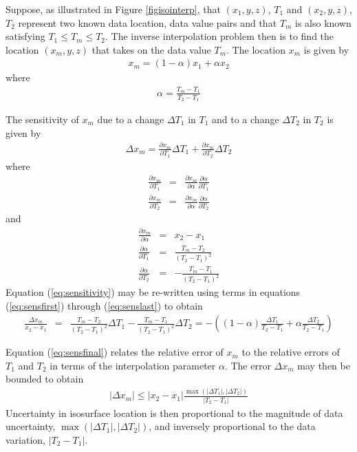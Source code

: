 \documentclass[11pt,twoside]{book}
\newcommand{\pxtone}{ \frac{\partial x_m}{\partial T_1} }
\newcommand{\pxttwo}{ \frac{\partial x_m}{\partial T_2} }
\newcommand{\pxalpha}{ \frac{\partial x_m}{\partial \alpha} }
\newcommand{\palphatone}{ \frac{\partial \alpha}{\partial T_1} }
\newcommand{\palphattwo}{ \frac{\partial \alpha}{\partial T_2} }
\begin{document}
Suppose, as illustrated in Figure \ref{figisointerp}, that $(x_1,y,z)$, $T_1$ and $(x_2,y,z)$, $T_2$ represent two known data location, data value pairs and that $T_m$ is also known satisfying $T_1\le T_m \le T_2$.  The inverse interpolation problem then is to find the location $(x_m,y,z)$ that takes on the data value $T_m$.  The location $x_m$ is given by
\begin{eqnarray*}
x_m=(1-\alpha)x_1+\alpha x_2
\end{eqnarray*}
where
\begin{eqnarray*}
\alpha=\frac{T_m-T_1}{T_2-T_1}
\end{eqnarray*}

\noindent The sensitivity of $x_m$ due to a change $\Delta T_1$ in $T_1$ and to a change $\Delta T_2$ in $T_2$ is given by
\begin{eqnarray}
\Delta x_m= \pxtone \Delta T_1 + \pxttwo \Delta T_2
\label{eq:sensitivity}
\end{eqnarray}
where
\begin{eqnarray}
\pxtone&=&\pxalpha\palphatone \label{eq:sensfirst}\\
\pxttwo&=&\pxalpha\palphattwo
\end{eqnarray}
and
\begin{eqnarray}
\pxalpha&=&x_2-x_1\\
\palphatone&=&\frac{T_m-T_2}{(T_2-T_1)^2}\\
\palphattwo&=&-\frac{T_m-T_1}{(T_2-T_1)^2}
\label{eq:senslast}
\end{eqnarray}
Equation (\ref{eq:sensitivity}) may be re-written using terms in equations (\ref{eq:sensfirst}) through (\ref{eq:senslast}) to obtain
\begin{eqnarray}
\frac{\Delta x_m}{x_2-x_1}&=&\frac{T_m-T_2}{(T_2-T_1)^2}\Delta T_1-
\frac{T_m-T_1}{(T_2-T_1)^2}\Delta T_2
=-\left(
(1-\alpha)\frac{\Delta T_1}{T_2-T_1}+
\alpha\frac{\Delta T_2}{T_2-T_1}\right)
\label{eq:sensfinal}
\end{eqnarray}

\noindent Equation (\ref{eq:sensfinal}) relates the relative error of $x_m$
to the relative errors of $T_1$ and $T_2$ in terms of the interpolation parameter $\alpha$.
The error $\Delta x_m$ may then be bounded to obtain
\begin{eqnarray}
|\Delta x_m|\le
|x_2-x_1|\frac{\max(|\Delta T_1|,|\Delta T_2|)}{|T_2-T_1|}
\end{eqnarray}
\noindent Uncertainty in isosurface location is then proportional to the magnitude of data uncertainty, $\max(|\Delta T_1|,|\Delta T_2|)$, and inversely proportional to the data variation, $|T_2-T_1|$.
\end{document}
